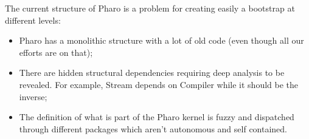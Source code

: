 The current structure of \gls{Pharo} is a problem for creating easily a bootstrap at different levels:
\begin{itemize}
	\item \gls{Pharo} has a monolithic structure with a lot of old code (even though all our efforts are on that);
	\item There are hidden structural dependencies requiring deep analysis to be revealed. For example, Stream depends on Compiler while it should be the inverse;
	\item The definition of what is part of the \gls{Pharo} kernel is fuzzy and dispatched through different packages which aren't autonomous and self contained.
\end{itemize}